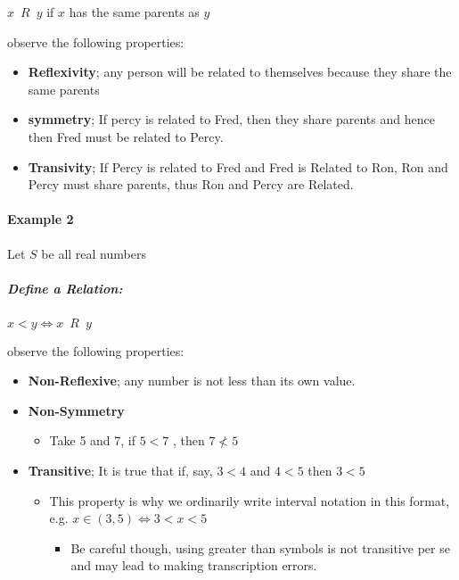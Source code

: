 \documentclass[
]{article}
\begin{document}
\(x \enspace R \enspace y\) if \(x\) has the same parents as \(y\)

observe the following properties:

\begin{itemize}
\item
  \textbf{Reflexivity}; any person will be related to themselves because
  they share the same parents
\item
  \textbf{symmetry}; If percy is related to Fred, then they share
  parents and hence then Fred must be related to Percy.
\item
  \textbf{Transivity}; If Percy is related to Fred and Fred is Related
  to Ron, Ron and Percy must share parents, thus Ron and Percy are
  Related.
\end{itemize}

\hypertarget{header-n363}{%
\paragraph{Example 2}\label{header-n363}}

Let \(S\) be all real numbers

\hypertarget{header-n365}{%
\subparagraph{Define a Relation:}\label{header-n365}}

\(x<y \iff x \enspace R \enspace y\)

observe the following properties:

\begin{itemize}
\item
  \textbf{Non-Reflexive}; any number is not less than its own value.
\item
  \textbf{Non-Symmetry}

  \begin{itemize}
  \item
    Take 5 and 7, if \(5<7\) , then \(7 \nless 5\)
  \end{itemize}
\item
  \textbf{Transitive}; It is true that if, say, \(3<4\) and \(4<5\) then
  \(3<5\)

  \begin{itemize}
  \item
    This property is why we ordinarily write interval notation in this
    format, e.g. \(x\in (3,5) \iff 3<x<5\)

    \begin{itemize}
    \item
      Be careful though, using greater than symbols is not transitive
      per se and may lead to making transcription errors.
    \end{itemize}
  \end{itemize}
\end{itemize}
\end{document}
